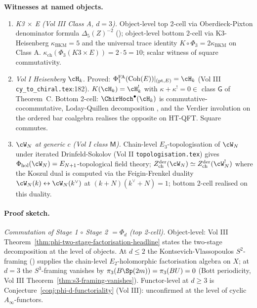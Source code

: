 \textbf{Witnesses at named objects.}
\begin{enumerate}
 \item \emph{K3 $\times$ E (Vol III Class A, $d=3$).} Object-level top
 2-cell via Oberdieck-Pixton denominator formula $\Delta_5(Z)^{-2}$
 (\cite{OberdieckPixton2019InventMath}); object-level bottom 2-cell
 via K3-Heisenberg $\kappa_{\mathrm{BKM}} = 5$ and the universal trace
 identity $K\circ\Phi_3 = 2\kappa_{\mathrm{BKM}}$ on Class A.
 $\kappa_{\mathrm{ch}}(\Phi_3(K3\times E)) = 2\cdot 5 = 10$; scalar
 witness of square commutativity.
 \item \emph{Vol I Heisenberg $\cH_k$.} Proved:
 $\Phi^{\mathrm{FA}}_1(\mathrm{Coh}(E))|_{(\mathrm{pt}, E)} = \cH_k$
 (Vol III \texttt{cy\_to\_chiral.tex}:182). $K(\cH_k) = \cH_k^!$ with
 $\kappa+\kappa^! = 0 \in$ class $\mathsf{G}$ of Theorem~C. Bottom
 2-cell: $\ChirHoch^\bullet(\cH_k)$ is commutative-cocommutative,
 Loday-Quillen decomposition \cite{LodayQuillen1984}, and the Verdier
 involution on the ordered bar coalgebra realises the opposite on
 HT-QFT. Square commutes.
 \item \emph{$\cW_N$ at generic $c$ (Vol I class $\mathsf{M}$).}
 Chain-level $E_3$-topologisation of $\cW_N$ under iterated
 Drinfeld-Sokolov (Vol II \texttt{topologisation.tex}) gives
 $\Phi_{\mathrm{hol}}(\cW_N) = E_{N+1}$-topological field theory;
 $Z^{\mathrm{der}}_{\mathrm{ch}}(\cW_N) \simeq Z^{\mathrm{der}}_{\mathrm{ch}}(\cW_N^!)$
 where the Koszul dual is computed via the Feigin-Frenkel duality
 $\cW_N(k) \leftrightarrow \cW_N(k^\vee)$ at
 $(k+N)(k^\vee+N)=1$; bottom 2-cell realised on this duality.
\end{enumerate}

\paragraph*{Proof sketch.}

\emph{Commutation of Stage 1 $\circ$ Stage 2 $=\Phi_d$ (top 2-cell).}
Object-level: Vol III
Theorem~\ref{thm:phi-two-stage-factorisation-headline} states the
two-stage decomposition at the level of objects. At $d\leq 2$ the
Kontsevich-Vlassopoulos $S^2$-framing (\cite{KontsevichVlassopoulos2022})
supplies the chain-level $E_2$-holomorphic factorisation algebra on
$X$; at $d=3$ the $S^3$-framing vanishes by
$\pi_3(B\Sp(2m)) = \pi_3(BU) = 0$ (Bott periodicity, Vol III
Theorem~\ref{thm:s3-framing-vanishes}). Functor-level at
$d \geq 3$ is Conjecture~\ref{conj:phi-d-functoriality}
(Vol III): unconfirmed at the level of cyclic $A_\infty$-functors.

